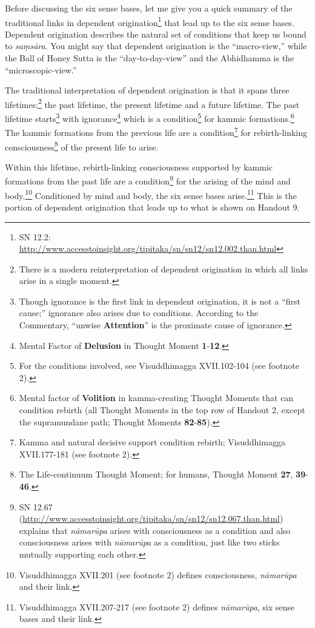 Before discussing the six sense bases, let me give you a quick summary of the traditional links in dependent origination\footnote{SN 12.2: \url{http://www.accesstoinsight.org/tipitaka/sn/sn12/sn12.002.than.html}} that lead up to the six sense bases. Dependent origination describes the natural set of conditions that keep us bound to \textit{saṃsāra}. You might say that dependent origination is the “macro-view,” while the Ball of Honey Sutta is the “day-to-day-view” and the Abhidhamma is the “microscopic-view.”

The traditional interpretation of dependent origination is that it spans three lifetimes;\footnote{There is a modern reinterpretation of dependent origination in which all links arise in a single moment.} the past lifetime, the present lifetime and a future lifetime. The past lifetime starts\footnote{Though ignorance is the first link in dependent origination, it is not a “first cause;” ignorance also arises due to conditions. According to the Commentary, “unwise \textbf{Attention}” is the proximate cause of ignorance.} with ignorance\footnote{Mental Factor of \textbf{Delusion} in Thought Moment \textbf{1}-\textbf{12}.} which is a condition\footnote{For the conditions involved, see Visuddhimagga XVII.102-104 (see footnote 2).} for kammic formations.\footnote{Mental factor of \textbf{Volition} in kamma-creating Thought Moments that can condition rebirth (all Thought Moments in the top row of Handout 2, except the supramundane path; Thought Moments \textbf{82}-\textbf{85}).} The kammic formations from the previous life are a condition\footnote{Kamma and natural decisive support condition rebirth; Visuddhimagga XVII.177-181 (see footnote 2).} for rebirth-linking consciousness\footnote{The Life-continuum Thought Moment; for humans, Thought Moment \textbf{27}, \textbf{39}-\textbf{46}.} of the present life to arise.

Within this lifetime, rebirth-linking consciousness supported by kammic formations from the past life are a condition\footnote{SN 12.67 (\url{http://www.accesstoinsight.org/tipitaka/sn/sn12/sn12.067.than.html}) explains that \textit{nāmarūpa} arises with consciousness as a condition and also consciousness arises with \textit{nāmarūpa} as a condition, just like two sticks mutually supporting each other.} for the arising of the mind and body.\footnote{Visuddhimagga XVII.201 (see footnote 2) defines consciousness, \textit{nāmarūpa} and their link.} Conditioned by mind and body, the six sense bases arise.\footnote{Visuddhimagga XVII.207-217 (see footnote 2) defines \textit{nāmarūpa}, six sense bases and their link.} This is the portion of dependent origination that leads up to what is shown on Handout 9.


